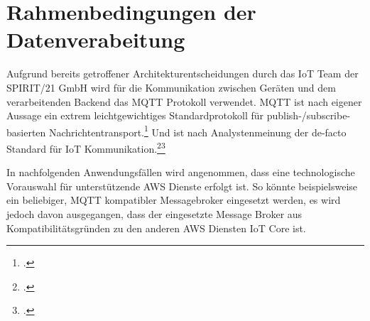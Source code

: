 \section{Rahmenbedingungen der Datenverabeitung}\label{chap:rahmendatenverarbeitung}
Aufgrund bereits getroffener Architekturentscheidungen durch das \ac{IoT} Team der SPIRIT/21 GmbH wird für die Kommunikation zwischen Geräten und dem verarbeitenden Backend das \ac{MQTT} Protokoll verwendet. \ac{MQTT} ist nach eigener Aussage ein extrem leichtgewichtiges Standardprotokoll für publish-/subscribe-basierten Nachrichtentransport.\footcite[Vgl.][]{o.V..2020} Und ist nach Analystenmeinung der de-facto Standard für \ac{IoT} Kommunikation.\footcite[Vgl.][]{Skerrett.25.10.2019}\nzitat \footcite[Vgl.][]{Cabe.17.04.2018} 

In nachfolgenden Anwendungsfällen wird angenommen, dass eine technologische Vorauswahl für unterstützende AWS Dienste erfolgt ist.
So könnte beispielsweise ein beliebiger, \ac{MQTT} kompatibler Messagebroker eingesetzt werden, es wird jedoch davon ausgegangen, dass der eingesetzte Message Broker aus Kompatibilitätsgründen zu den anderen \ac{AWS} Diensten \ac{IoT} Core ist.

